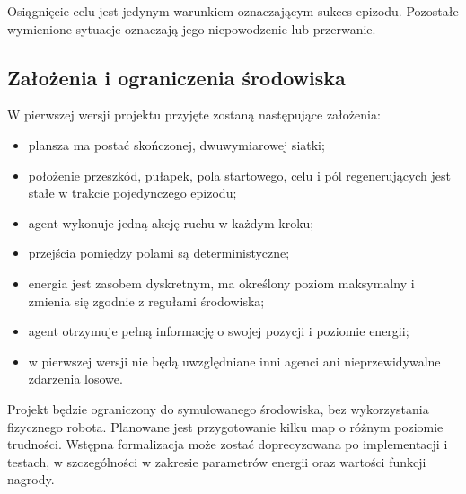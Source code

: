 \documentclass[12pt]{article}
\begin{document}
Osiągnięcie celu jest jedynym warunkiem oznaczającym sukces epizodu. Pozostałe wymienione sytuacje oznaczają jego niepowodzenie lub przerwanie.

\subsection{Założenia i ograniczenia środowiska}

W pierwszej wersji projektu przyjęte zostaną następujące założenia:
\begin{itemize}
    \item plansza ma postać skończonej, dwuwymiarowej siatki;
    \item położenie przeszkód, pułapek, pola startowego, celu i pól regenerujących jest stałe w trakcie pojedynczego epizodu;
    \item agent wykonuje jedną akcję ruchu w każdym kroku;
    \item przejścia pomiędzy polami są deterministyczne;
    \item energia jest zasobem dyskretnym, ma określony poziom maksymalny i zmienia się zgodnie z regułami środowiska;
    \item agent otrzymuje pełną informację o swojej pozycji i poziomie energii;
    \item w pierwszej wersji nie będą uwzględniane inni agenci ani nieprzewidywalne zdarzenia losowe.
\end{itemize}

Projekt będzie ograniczony do symulowanego środowiska, bez wykorzystania fizycznego robota. Planowane jest przygotowanie kilku map o różnym poziomie trudności. Wstępna formalizacja może zostać doprecyzowana po implementacji i testach, w szczególności w zakresie parametrów energii oraz wartości funkcji nagrody.
\end{document}
